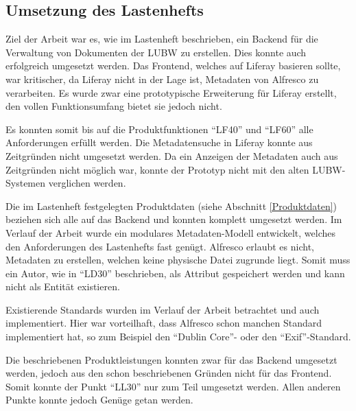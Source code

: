 \subsection{Umsetzung des Lastenhefts}
Ziel der Arbeit war es, wie im Lastenheft beschrieben, ein Backend f\"ur die Verwaltung von Dokumenten der \ac{LUBW} zu erstellen. Dies konnte auch erfolgreich umgesetzt werden. Das Frontend, welches auf Liferay basieren sollte, war kritischer, da Liferay nicht in der Lage ist, Metadaten von Alfresco zu verarbeiten. Es wurde zwar eine prototypische Erweiterung f\"ur Liferay erstellt, den vollen Funktionsumfang bietet sie jedoch nicht.

Es konnten somit bis auf die Produktfunktionen "`LF40"' und "`LF60"' alle Anforderungen erf\"ullt werden. Die Metadatensuche in Liferay konnte aus Zeitgr\"unden nicht umgesetzt werden. Da ein Anzeigen der Metadaten auch aus Zeitgr\"unden nicht m\"oglich war, konnte der Prototyp nicht mit den alten \ac{LUBW}-Systemen verglichen werden.

Die im Lastenheft festgelegten Produktdaten (siehe Abschnitt \ref{Produktdaten}) beziehen sich alle auf das Backend und konnten komplett umgesetzt werden. Im Verlauf der Arbeit wurde ein modulares Metadaten-Modell entwickelt, welches den Anforderungen des Lastenhefts fast gen\"ugt. Alfresco erlaubt es nicht, Metadaten zu erstellen, welchen keine physische Datei zugrunde liegt. Somit muss ein Autor, wie in "`LD30"' beschrieben, als Attribut gespeichert werden und kann nicht als Entit\"at existieren.

Existierende Standards wurden im Verlauf der Arbeit betrachtet und auch implementiert. Hier war vorteilhaft, dass Alfresco schon manchen Standard implementiert hat, so zum Beispiel den "`Dublin Core"'- oder den "`\ac{Exif}"'-Standard.

Die beschriebenen Produktleistungen konnten zwar f\"ur das Backend umgesetzt werden, jedoch aus den schon beschriebenen Gr\"unden nicht f\"ur das Frontend. Somit konnte der Punkt "`LL30"' nur zum Teil umgesetzt werden. Allen anderen Punkte konnte jedoch Gen\"uge getan werden.


